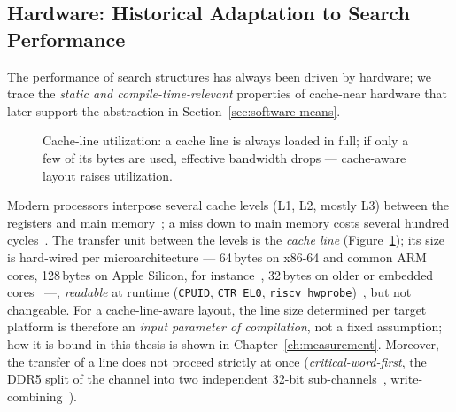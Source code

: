 \begin{nurkurz}
\section{Hardware: Historical Adaptation to Search Performance}\label{sec:hardware-history}
The performance of search structures has always been driven by hardware; we trace the \emph{static and
compile-time-relevant} properties of cache-near hardware that later support the abstraction in
Section~\ref{sec:software-means}.
\begin{figure}[htbp]\centering
{}
\caption{Cache-line utilization: a cache line is always loaded in full; if only a few of its bytes are used, effective bandwidth drops --- cache-aware layout raises utilization.}\label{fig:cache-line}
\end{figure}
Modern processors interpose several cache levels (L1, L2, mostly L3) between the registers and main
memory~\cite{hennessy2019architecture}; a miss down to main memory costs several hundred
cycles~\cite{drepper2007memory}. The transfer unit between the levels is the \emph{cache line}
(Figure~\ref{fig:cache-line}); its size is hard-wired per microarchitecture --- 64\,bytes on x86-64 and common
ARM cores, 128\,bytes on Apple Silicon, for instance~\cite{apple_optimization}, 32\,bytes on older or embedded
cores~\cite{hennessy2019architecture,intel_optimization,amd_sog} ---, \emph{readable} at runtime
(\texttt{CPUID}, \texttt{CTR\_EL0}, \texttt{riscv\_hwprobe})~\cite{arm_arm,intel_sdm,linux_riscv_hwprobe}, but
not changeable. For a cache-line-aware layout, the line size determined per target platform is therefore an
\emph{input parameter of compilation}, not a fixed assumption; how it is bound in this thesis is shown in
Chapter~\ref{ch:measurement}. Moreover, the transfer of a line does not proceed strictly at once
(\emph{critical-word-first}, the DDR5 split of the channel into two independent 32-bit
sub-channels~\cite{micron_ddr5}, write-combining~\cite{intel_sdm}).
\end{nurkurz}

